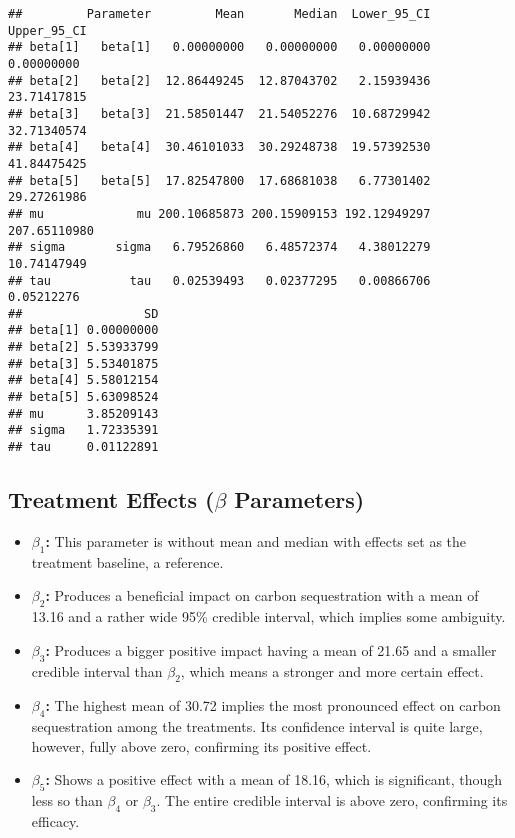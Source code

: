 \documentclass[
]{article}
\begin{document}
\begin{verbatim}
##         Parameter         Mean       Median  Lower_95_CI  Upper_95_CI
## beta[1]   beta[1]   0.00000000   0.00000000   0.00000000   0.00000000
## beta[2]   beta[2]  12.86449245  12.87043702   2.15939436  23.71417815
## beta[3]   beta[3]  21.58501447  21.54052276  10.68729942  32.71340574
## beta[4]   beta[4]  30.46101033  30.29248738  19.57392530  41.84475425
## beta[5]   beta[5]  17.82547800  17.68681038   6.77301402  29.27261986
## mu             mu 200.10685873 200.15909153 192.12949297 207.65110980
## sigma       sigma   6.79526860   6.48572374   4.38012279  10.74147949
## tau           tau   0.02539493   0.02377295   0.00866706   0.05212276
##                 SD
## beta[1] 0.00000000
## beta[2] 5.53933799
## beta[3] 5.53401875
## beta[4] 5.58012154
## beta[5] 5.63098524
## mu      3.85209143
## sigma   1.72335391
## tau     0.01122891
\end{verbatim}

\subsection{\texorpdfstring{Treatment Effects (\(\beta\)
Parameters)}{Treatment Effects (\textbackslash beta Parameters)}}\label{treatment-effects-beta-parameters}

\begin{itemize}
\item
  \textbf{\(\beta_1\):} This parameter is without mean and median with
  effects set as the treatment baseline, a reference.
\item
  \textbf{\(\beta_2\):} Produces a beneficial impact on carbon
  sequestration with a mean of 13.16 and a rather wide 95\% credible
  interval, which implies some ambiguity.
\item
  \textbf{\(\beta_3\):} Produces a bigger positive impact having a mean
  of 21.65 and a smaller credible interval than \(\beta_2\), which means
  a stronger and more certain effect.
\item
  \textbf{\(\beta_4\):} The highest mean of 30.72 implies the most
  pronounced effect on carbon sequestration among the treatments. Its
  confidence interval is quite large, however, fully above zero,
  confirming its positive effect.
\item
  \textbf{\(\beta_5\):} Shows a positive effect with a mean of 18.16,
  which is significant, though less so than \(\beta_4\) or \(\beta_3\).
  The entire credible interval is above zero, confirming its efficacy.
\end{itemize}
\end{document}
